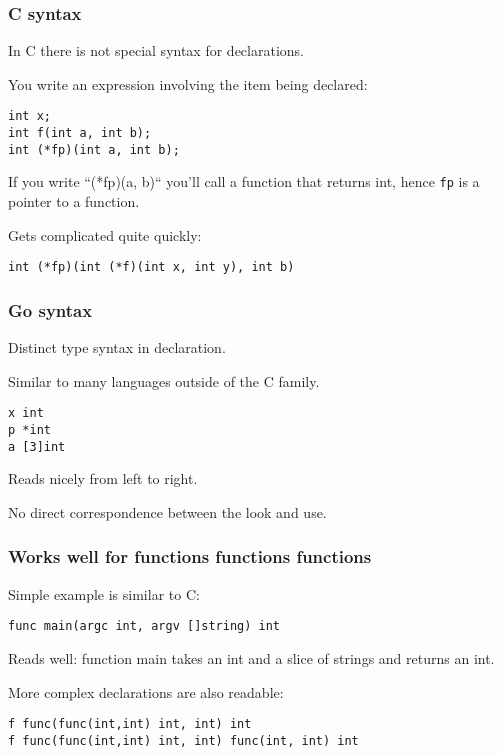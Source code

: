 \documentclass[9pt]{beamer}
\begin{document}
\begin{frame}[fragile]
\frametitle{C syntax}


In C there is not special syntax for declarations.


You write an expression involving the item being declared:



\begin{verbatim}
int x;
int f(int a, int b);
int (*fp)(int a, int b);

\end{verbatim}


If you write ``(*fp)(a, b)`` you'll call a function that returns int, hence \texttt{fp} is a pointer to a function.


Gets complicated quite quickly:



\begin{verbatim}
int (*fp)(int (*f)(int x, int y), int b)

\end{verbatim}



\end{frame}

\begin{frame}[fragile]
\frametitle{Go syntax}


Distinct type syntax in declaration.


Similar to many languages outside of the C family.



\begin{verbatim}
x int
p *int
a [3]int

\end{verbatim}


Reads nicely from left to right.


No direct correspondence between the look and use.



\end{frame}

\begin{frame}[fragile]
\frametitle{Works well for functions functions functions}


Simple example is similar to C:



\begin{verbatim}
func main(argc int, argv []string) int

\end{verbatim}


Reads well: function main takes an int and a slice of strings and returns an int.


More complex declarations are also readable:



\begin{verbatim}
f func(func(int,int) int, int) int
f func(func(int,int) int, int) func(int, int) int

\end{verbatim}



\end{frame}
\end{document}
